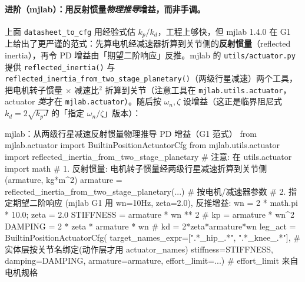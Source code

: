 \paragraph{进阶（mjlab）：用反射惯量\emph{物理推导}增益，而非手调。}上面 \verb|datasheet_to_cfg| 用经验式估 $k_p/k_d$，工程上够快，但 mjlab 1.4.0 在 G1 上给出了更严谨的范式：先算电机经减速器折算到关节侧的\textbf{反射惯量}（reflected inertia），再令 PD 增益由「期望二阶响应」反推。mjlab 的 \verb|utils/actuator.py| 提供 \verb|reflected_inertia()| 与 \verb|reflected_inertia_from_two_stage_planetary()|（两级行星减速）两个工具，把电机转子惯量 $\times$ 减速比$^2$ 折算到关节（注意工具在 \verb|mjlab.utils.actuator|，actuator \emph{类}才在 \verb|mjlab.actuator|）。随后按 $\omega_n,\zeta$ 设增益（这正是临界阻尼式 $k_d=2\sqrt{k_p J}$ 的「指定 $\omega_n/\zeta$」版本）：

\begin{codebox}[Python]{mjlab：从两级行星减速反射惯量物理推导 PD 增益（G1 范式）}
from mjlab.actuator import BuiltinPositionActuatorCfg
from mjlab.utils.actuator import reflected_inertia_from_two_stage_planetary  # 注意: 在 utils.actuator
import math
# 1. 反射惯量: 电机转子惯量经两级行星减速折算到关节侧 (armature, kg*m^2)
armature = reflected_inertia_from_two_stage_planetary(...)   # 按电机/减速器参数
# 2. 指定期望二阶响应 (mjlab G1 用 wn=10Hz, zeta=2.0), 反推增益:
wn = 2 * math.pi * 10.0; zeta = 2.0
STIFFNESS = armature * wn ** 2                # kp = armature * wn^2
DAMPING   = 2 * zeta * armature * wn          # kd = 2*zeta*armature*wn
leg_act = BuiltinPositionActuatorCfg(
    target_names_expr=[".*_hip_.*", ".*_knee_.*"],   # 实体层按关节名绑定(动作层才用 actuator_names)
    stiffness=STIFFNESS, damping=DAMPING, armature=armature,
    effort_limit=...)                          # effort_limit 来自电机规格
\end{codebox}


